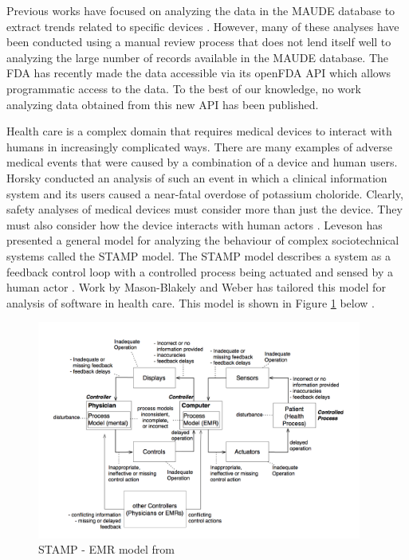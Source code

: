 \documentclass[11pt, notitlepage,abstracton,oneside]{article}   	%
\begin{document}
Previous works have focused on analyzing the data in the MAUDE database to extract trends related to specific devices \cite{weber_preliminary_2011, fuller_electrosurgical_2012}. However, many of these analyses have been conducted using a manual review process that does not lend itself well to analyzing the large number of records available in the MAUDE database. The FDA has recently made the data accessible via its openFDA API which allows programmatic access to the data. To the best of our knowledge, no work analyzing data obtained from this new API has been published.

Health care is a complex domain that requires medical devices to interact with humans in increasingly complicated ways. There are many examples of adverse medical events that were caused by a combination of a device and human users. Horsky conducted an analysis of such an event \cite{horsky_2005} in which a clinical information system and its users caused a near-fatal overdose of potassium choloride. Clearly, safety analyses of medical devices must consider more than just the device. They must also consider how the device interacts with human actors \cite{karsh_health_2010}. Leveson has presented a general model for analyzing the behaviour of complex sociotechnical systems called the STAMP model. The STAMP model describes a system as a feedback control loop with a controlled process being actuated and sensed by a human actor \cite{leveson_engineering_2012}. Work by Mason-Blakely and Weber has tailored this model for analysis of software in health care. This model is shown in Figure \ref{fig:stamp-emr} below \cite{stamp_emr_2011}.

\begin{figure}[ht]
	\centering
	\includegraphics[width=0.95\textwidth]{figures/stamp-emr}
	\caption{STAMP - EMR model from \cite{stamp_emr_2011}}
	\label{fig:stamp-emr}
\end{figure}
\end{document}
